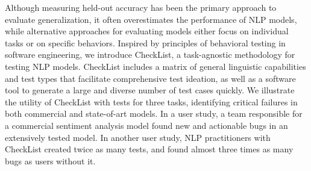 Although measuring held-out accuracy has been the primary approach to evaluate generalization, it often overestimates the performance of NLP models, while alternative approaches for evaluating models either focus on individual tasks or on specific behaviors. Inspired by principles of behavioral testing in software engineering, we introduce CheckList, a task-agnostic methodology for testing NLP models. CheckList includes a matrix of general linguistic capabilities and test types that facilitate comprehensive test ideation, as well as a software tool to generate a large and diverse number of test cases quickly. We illustrate the utility of CheckList with tests for three tasks, identifying critical failures in both commercial and state-of-art models. In a user study, a team responsible for a commercial sentiment analysis model found new and actionable bugs in an extensively tested model. In another user study, NLP practitioners with CheckList created twice as many tests, and found almost three times as many bugs as users without it.
